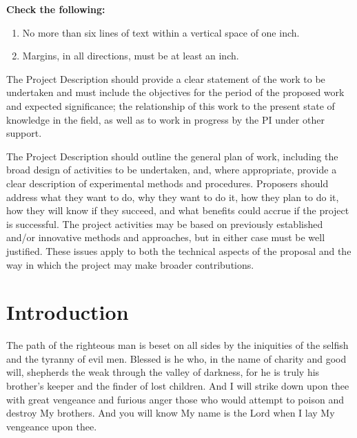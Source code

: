 
\begin{pappg}
    \textbf{Check the following:}
    \begin{enumerate}
            \def\labelenumi{\alph{enumi}.}
            \setcounter{enumi}{1}
        \item
            No more than six lines of text within a vertical space of one inch.
        \item
            Margins, in all directions, must be at least an inch.
    \end{enumerate}
\end{pappg}
\begin{pappg}
    The
    Project Description should provide a clear statement of the work to be
    undertaken and must include the objectives for the period of the
    proposed work and expected significance; the relationship of this work
    to the present state of knowledge in the field, as well as to work in
    progress by the PI under other support.

    The Project Description should outline the general plan of work,
    including the broad design of activities to be undertaken, and, where
    appropriate, provide a clear description of experimental methods and
    procedures. Proposers should address what they want to do, why they want
    to do it, how they plan to do it, how they will know if they succeed,
    and what benefits could accrue if the project is successful. The project
    activities may be based on previously established and/or innovative
    methods and approaches, but in either case must be well justified. These
    issues apply to both the technical aspects of the proposal and the way
    in which the project may make broader contributions.
\end{pappg}

\section{Introduction}
\label{intro}
The path of the righteous man is beset on all sides by the iniquities of the selfish and the tyranny of evil men. Blessed is he who, in the name of charity and good will, shepherds the weak through the valley of darkness, for he is truly his brother's keeper and the finder of lost children. And I will strike down upon thee with great vengeance and furious anger those who would attempt to poison and destroy My brothers. And you will know My name is the Lord when I lay My vengeance upon thee.

